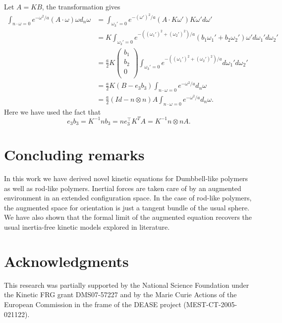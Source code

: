 \documentclass[reqno]{amsart}
\numberwithin{equation}{section}
\theoremstyle{definition}
\theoremstyle{remark}
\begin{document}
Let $A=KB$, the transformation gives
\begin{align*}
\int _{ n\cdot \omega=0} e^{-\omega^2/a}(A\cdot \omega)\omega d_n\omega &=
\int _{ \omega_3'=0} e^{-(\omega')^2/a}(A\cdot K\omega')K\omega' d\omega' \\
& =K\int_{\omega_3'=0} e^{-((\omega_1')^2+(\omega_2')^2)/a}(b_1\omega_1'+b_2\omega_2')\omega'd\omega_1'd\omega_2'\\
&=\frac{a}{2}K\left(
                \begin{array}{c}
                  b_1 \\
                  b_2 \\
                  0 \\
                \end{array}
              \right)
\int_{\omega_3'=0} e^{-((\omega_1')^2+(\omega_2')^2)/a}d\omega_1'd\omega_2' \\
&=\frac{a}{2}K (B-e_3b_3) \int _{n\cdot \omega=0}
e^{-\omega^2/a}d_n\omega
\\
&=\frac{a}{2}(Id-n\otimes n)A \int _{n\cdot \omega=0} e^{-\omega^2/a}d_n\omega.
\end{align*}
Here we have used the fact that
$$e_3b_3=K^{-1}nb_3=ne_3^\top K^TA=K^{-1}n\otimes n A.
$$
\section{Concluding remarks}
In this work we have derived novel kinetic equations for
Dumbbell-like polymers as well as rod-like polymers. Inertial forces
are taken care of by an augmented environment in an extended configuration space. In the
case of rod-like polymers, the augmented space for orientation is
just a tangent bundle of the usual sphere. We have also shown that
the formal limit of the augmented equation recovers the usual
inertia-free kinetic models explored in literature.

\bigskip
\section*{Acknowledgments}
This research was partially supported by the National Science Foundation under the Kinetic FRG grant DMS07-57227 and by the Marie Curie Actions of the European Commission in the frame of the DEASE project (MEST-CT-2005-021122).
\end{document}
